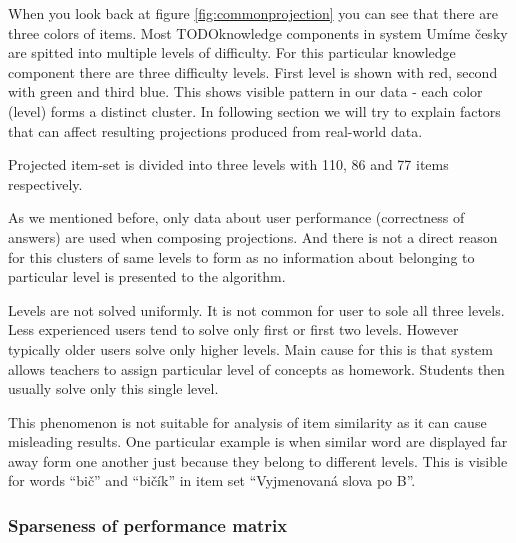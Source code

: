 \documentclass[
  digital, %
  table,   %
  nolof,     %
  nolot,     %
  nocover
]{fithesis3}
\begin{document}

When you look back at figure \ref{fig:commonprojection} you can see that
there are three colors of items. Most TODOknowledge components in system
Umíme česky are spitted into multiple levels of difficulty. For this
particular knowledge component there are three difficulty levels. First
level is shown with red, second with green and third blue. This shows
visible pattern in our data - each color (level) forms a distinct
cluster. In following section we will try to explain factors that can
affect resulting projections produced from real-world data.

Projected item-set is divided into three levels with 110, 86 and 77 items respectively.

As we mentioned before, only data about user performance (correctness of
answers) are used when composing projections. And there is not a direct
reason for this clusters of same levels to form as no information about
belonging to particular level is presented to the algorithm.


Levels are not solved uniformly. It is not common for user to sole all
three levels. Less experienced users tend to solve only first or first
two levels. However typically older users solve only higher levels. Main
cause for this is that system allows teachers to assign particular level
of concepts as homework. Students then usually solve only this single
level.



This phenomenon is not suitable for analysis of item similarity as it
can cause misleading results. One particular example is when similar
word are displayed far away form one another just because they belong to
different levels. This is visible for words ``bič'' and ``bičík'' in
item set ``Vyjmenovaná slova po B''.

\subsubsection{Sparseness of performance
matrix}\label{sparseness-of-performance-matrix}


\end{document}
